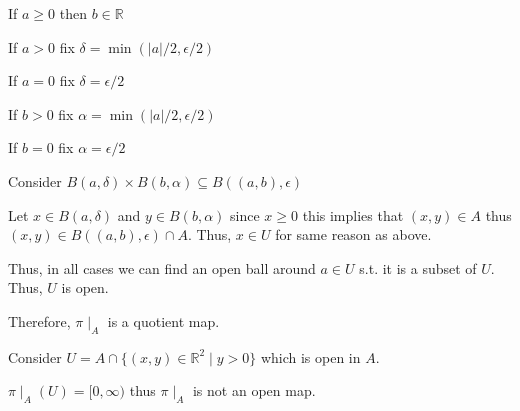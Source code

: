 \documentclass[12pt, letterpaper]{article}
\newcommand{\R}{\mathbb{R}}
\begin{document}
\begin{enumerate}
    If $a \geq 0$ then $b \in \R$

    If $a > 0$ fix $\delta = \min(|a|/2, \epsilon/2)$

    If $a = 0$ fix $\delta = \epsilon/2$

    If $b > 0$ fix $\alpha = \min(|a|/2, \epsilon/2)$

    If $b = 0$ fix $\alpha = \epsilon/2$

    Consider $B(a,\delta) \times B(b, \alpha) \subseteq B((a,b),\epsilon)$

    Let $x \in B(a,\delta)$ and $y \in B(b, \alpha)$ since $x \geq 0$ this implies that $(x,y) \in A$ thus $(x,y) \in B((a,b),\epsilon) \cap A$. Thus, $x \in U$ for same reason as above.

    Thus, in all cases we can find an open ball around $a \in U$ s.t. it is a subset of $U$. Thus, $U$ is open.

    Therefore, $\pi \mid_A$ is a quotient map.

    Consider $U=A \cap \{(x,y) \in \R^2 \mid y > 0\}$ which is open in $A$.

    $\pi \mid_A(U)=[0,\infty)$ thus $\pi \mid_A$ is not an open map.
\end{enumerate}
\end{document}
